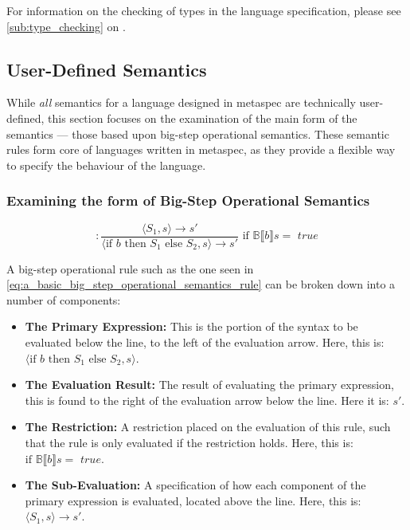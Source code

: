 For information on the checking of types in the language specification, please see \autoref{sub:type_checking} on . 


\subsection{User-Defined Semantics} %
\label{sub:user_defined_semantics}
While \textit{all} semantics for a language designed in \gls{metaspec} are technically user-defined, this section focuses on the examination of the main form of the semantics --- those based upon big-step operational semantics. 
These semantic rules form core of languages written in \gls{metaspec}, as they provide a flexible way to specify the behaviour of the language. 

\subsubsection{Examining the form of Big-Step Operational Semantics} %
\label{ssub:examining_the_form_of_big_step_operational_semantics}
\begin{equation}
    [\text{if}] : \frac{\langle S_1, s \rangle \to s'}{\langle \text{if } b \text{ then } S_1 \text{ else } S_2, s\rangle \to s'} \text{ if } \mathbb{B}\llbracket b \rrbracket s = \textit{ true} 
    \label{eq:a_basic_big_step_operational_semantics_rule}
\end{equation}

A big-step operational rule such as the one seen in \autoref{eq:a_basic_big_step_operational_semantics_rule} can be broken down into a number of components:
\begin{itemize}
    \item \textbf{The Primary Expression:} \label{item:the_primary_expression} This is the portion of the syntax to be evaluated below the line, to the left of the evaluation arrow.
    Here, this is: $\langle \text{if } b \text{ then } S_1 \text{ else } S_2, s \rangle$.
    \item \textbf{The Evaluation Result:} The result of evaluating the primary expression, this is found to the right of the evaluation arrow below the line.
    Here it is: $s'$. 
    \item \textbf{The Restriction:} A restriction placed on the evaluation of this rule, such that the rule is only evaluated if the restriction holds. 
    Here, this is: $\text{if } \mathbb{B}\llbracket b \rrbracket s = \textit{ true}$.
    \item \textbf{The Sub-Evaluation:} A specification of how each component of the primary expression is evaluated, located above the line.
    Here, this is: $\langle S_1, s \rangle \to s'$. 
\end{itemize}

